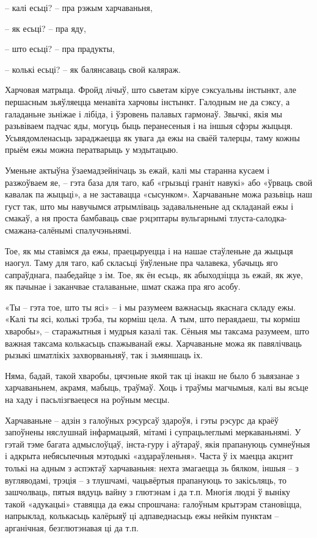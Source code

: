 – калі есьці? – пра рэжым харчаваньня,

– як есьці? – пра яду,

– што есьці? – пра прадукты,

– колькі есьці? – як балянсаваць свой каляраж.

Харчовая матрыца. Фройд лічыў, што сьветам кіруе сэксуальны інстынкт, але першасным зьяўляецца менавіта харчовы інстынкт. Галодным не да сэксу, а галаданьне зьніжае і лібіда, і ўзровень палавых гармонаў. Звычкі, якія мы разьвіваем падчас яды, могуць быць перанесеныя і на іншыя сфэры жыцьця. Усьвядомленасьць зараджаецца як увага да ежы на сваёй талерцы, таму кожны прыём ежы можна ператварыць у мэдытацыю.

Уменьне актыўна ўзаемадзейнічаць зь ежай, калі мы старанна кусаем і разжоўваем яе, – гэта база для таго, каб «грызьці граніт навукі» або «ўрваць свой кавалак па жыцьці», а не заставацца «сысунком». Харчаваньне можа разьвіць наш густ так, што мы навучымся атрымліваць задавальненьне ад складанай ежы і смакаў, а ня проста бамбаваць свае рэцэптары вульгарнымі тлуста-салодка-смажана-салёнымі спалучэньнямі.

Тое, як мы ставімся да ежы, праецыруецца і на нашае стаўленьне да жыцьця наогул. Таму для таго, каб скласьці ўяўленьне пра чалавека, убачыць яго сапраўднага, паабедайце з ім. Тое, як ён есьць, як абыходзіцца зь ежай, як жуе, як пачынае і заканчвае сталаваньне, шмат скажа пра яго асобу.

«Ты – гэта тое, што ты ясі» – і мы разумеем важнасьць якаснага складу ежы. «Калі ты ясі, колькі трэба, ты корміш цела. А тым, што пераядаеш, ты корміш хваробы», – старажытныя і мудрыя казалі так. Сёньня мы таксама разумеем, што важная таксама колькасьць спажыванай ежы. Харчаваньне можа як павялічваць рызыкі шматлікіх захворваньняў, так і зьмяншаць іх.

Няма, бадай, такой хваробы, цячэньне якой так ці інакш не было б зьвязанае з харчаваньнем, акрамя, мабыць, траўмаў. Хоць і траўмы магчымыя, калі вы ясьце на хаду і пасьлізгваецеся на роўным месцы.

Харчаваньне – адзін з галоўных рэсурсаў здароўя, і гэты рэсурс да краёў запоўнены няслушнай інфармацыяй, мітамі і супрацьлеглымі меркаваньнямі. У гэтай тэме багата адмыслоўцаў, інста-гуру і аўтараў, якія прапануюць сумнеўныя і адкрыта небясьпечныя мэтодыкі «аздараўленьня». Часта ў іх маецца акцэнт толькі на адным з аспэктаў харчаваньня: нехта змагаецца зь бялком, іншыя – з вугляводамі, трэція – з тлушчамі, чацьвёртыя прапануюць то закісьляць, то зашчолваць, пятыя вядуць вайну з глютэнам і да т.п. Многія людзі ў выніку такой «адукацыі» ставяцца да ежы спрошчана: галоўным крытэрам становіцца, напрыклад, колькасьць калёрыяў ці адпаведнасьць ежы нейкім пунктам – арганічная, безглютэнавая ці да т.п.

